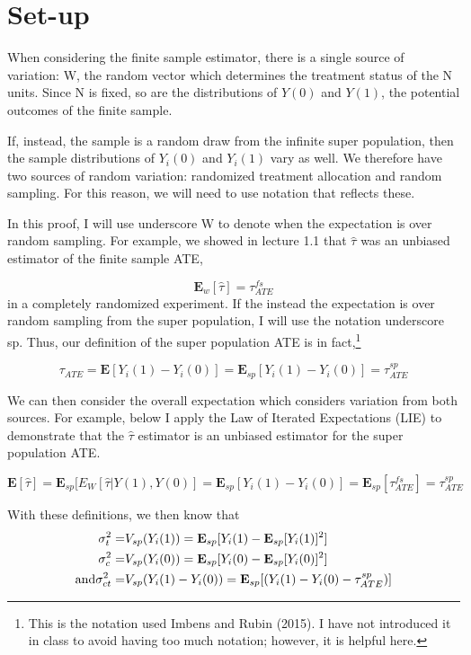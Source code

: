 \documentclass[
  letterpaper,
  DIV=11,
  numbers=noendperiod]{scrreprt}
\theoremstyle{definition}
\theoremstyle{remark}
\begin{document}
\section{Set-up}\label{set-up-3}

When considering the finite sample estimator, there is a single source
of variation: W, the random vector which determines the treatment status
of the N units. Since N is fixed, so are the distributions of \(Y(0)\)
and \(Y(1)\), the potential outcomes of the finite sample.

If, instead, the sample is a random draw from the infinite super
population, then the sample distributions of \(Y_i(0)\) and \(Y_i(1)\)
vary as well. We therefore have two sources of random variation:
randomized treatment allocation and random sampling. For this reason, we
will need to use notation that reflects these.

In this proof, I will use underscore W to denote when the expectation is
over random sampling. For example, we showed in lecture 1.1 that
\(\hat{\tau}\) was an unbiased estimator of the finite sample ATE,

\[
\mathbf{E}_w[\hat{\tau}]=\tau_{ATE}^{fs}
\] in a completely randomized experiment. If the instead the expectation
is over random sampling from the super population, I will use the
notation underscore sp. Thus, our definition of the super population ATE
is in fact,\footnote{This is the notation used Imbens and Rubin (2015).
  I have not introduced it in class to avoid having too much notation;
  however, it is helpful here.}

\[
\tau_{ATE} = \mathbf{E}[Y_i(1)-Y_i(0)]=\mathbf{E}_{sp}[Y_i(1)-Y_i(0)]=\tau_{ATE}^{sp}
\]

We can then consider the overall expectation which considers variation
from both sources. For example, below I apply the Law of Iterated
Expectations (LIE) to demonstrate that the \(\hat{\tau}\) estimator is
an unbiased estimator for the super population ATE.

\[
\mathbf{E}[\hat{\tau}]=\mathbf{E}_{sp}[E_W[\hat{\tau}|Y(1),Y(0)]=\mathbf{E}_{sp}[Y_i(1)-Y_i(0)]=\mathbf{E}_{sp}[\tau_{ATE}^{fs}]=\tau_{ATE}^{sp}
\]

With these definitions, we then know that \[
\begin{align}
\sigma_t^2 =& V_{sp}(Y_i(1))=\mathbf{E}_{sp}[Y_i(1)-\mathbf{E}_{sp}[Y_i(1)]^2] \\
\sigma_c^2 =& V_{sp}(Y_i(0))=\mathbf{E}_{sp}[Y_i(0)-\mathbf{E}_{sp}[Y_i(0)]^2] \\
\text{and}\space\space\space \sigma_{ct}^2 =& V_{sp}(Y_i(1)-Y_i(0))=\mathbf{E}_{sp}[(Y_i(1)-Y_i(0)-\tau_{ATE}^{sp})] \\
\end{align}
\]
\end{document}

